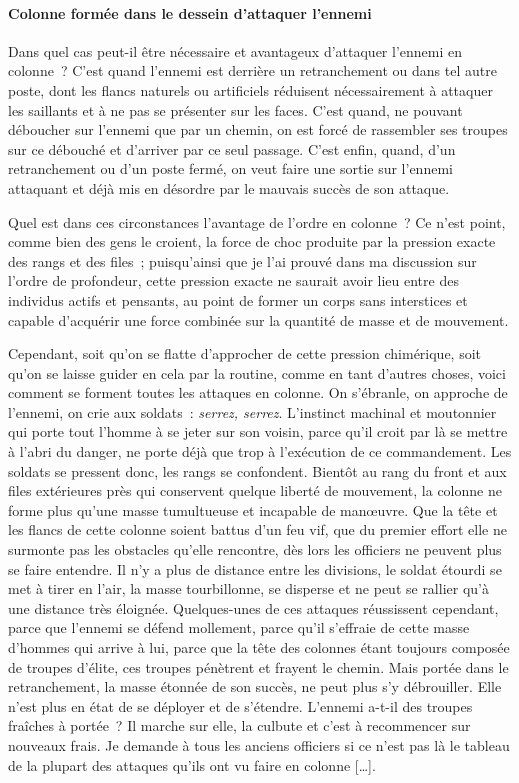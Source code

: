 \documentclass[french,twoside]{book} %
\begin{document}
\paragraph[{Colonne formée dans le dessein d’attaquer l’ennemi}]{Colonne formée dans le dessein d’attaquer l’ennemi}
\noindent Dans quel cas peut-il être nécessaire et avantageux d’attaquer l’ennemi en colonne ? C’est quand l’ennemi est derrière un retranchement ou dans tel autre poste, dont les flancs naturels ou artificiels réduisent nécessairement à attaquer les saillants et à ne pas se présenter sur les faces. C’est quand, ne pouvant déboucher sur l’ennemi que par un chemin, on est forcé de rassembler ses troupes sur ce débouché et d’arriver par ce seul passage. C’est enfin, quand, d’un retranchement ou d’un poste fermé, on veut faire une sortie sur l’ennemi attaquant et déjà mis en désordre par le mauvais succès de son attaque.\par
Quel est dans ces circonstances l’avantage de l’ordre en colonne ? Ce n’est point, comme bien des gens le croient, la force de choc produite par la pression exacte des rangs et des files ; puisqu’ainsi que je l’ai prouvé dans ma discussion sur l’ordre de profondeur, cette pression exacte ne saurait avoir lieu entre des individus actifs et pensants, au point de former un corps sans interstices et capable d’acquérir une force combinée sur la quantité de masse et de mouvement.\par
Cependant, soit qu’on se flatte d’approcher de cette pression chimérique, soit qu’on se laisse guider en cela par la routine, comme en tant d’autres choses, voici comment se forment toutes les attaques en colonne. On s’ébranle, on approche de l’ennemi, on crie aux soldats : {\itshape serrez, serrez}. L’instinct machinal et moutonnier qui porte tout l’homme à se jeter sur son voisin, parce qu’il croit par là se mettre à l’abri du danger, ne porte déjà que trop à l’exécution de ce commandement. Les soldats se pressent donc, les rangs se confondent. Bientôt au rang du front et aux files extérieures près qui conservent quelque liberté de mouvement, la colonne ne forme plus qu’une masse tumultueuse et incapable de manœuvre. Que la tête et les flancs de cette colonne soient battus d’un feu vif, que du premier effort elle ne surmonte pas les obstacles qu’elle rencontre, dès lors les officiers ne peuvent plus se faire entendre. Il n’y a plus de distance entre les divisions, le soldat étourdi se met à tirer en l’air, la masse tourbillonne, se disperse et ne peut se rallier qu’à une distance très éloignée. Quelques-unes de ces attaques réussissent cependant, parce que l’ennemi se défend mollement, parce qu’il s’effraie de cette masse d’hommes qui arrive à lui, parce que la tête des colonnes étant toujours composée de troupes d’élite, ces troupes pénètrent et frayent le chemin. Mais portée dans le retranchement, la masse étonnée de son succès, ne peut plus s’y débrouiller. Elle n’est plus en état de se déployer et de s’étendre. L’ennemi a-t-il des troupes fraîches à portée ? Il marche sur elle, la culbute et c’est à recommencer sur nouveaux frais. Je demande à tous les anciens officiers si ce n’est pas là le tableau de la plupart des attaques qu’ils ont vu faire en colonne […].\par
\end{document}
